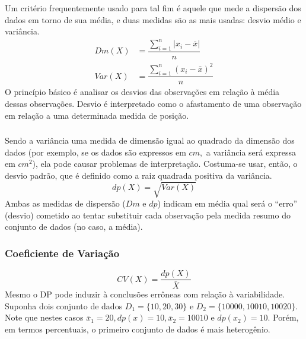 \documentclass[14pt,aspectratio=1610]{beamer}
\begin{document}
\begin{frame}{}
\frametitle{}
\begin{block}{}
\justifying
Um critério frequentemente usado para tal fim é aquele que mede a dispersão dos
dados em torno de sua média, e duas medidas são as mais usadas: desvio médio e variância.
\begin{align}
Dm(X) &=\displaystyle \dfrac{\sum_{i=1}^{n}|x_{i}-\bar{x}|}{n}\\
Var(X)&=\displaystyle \dfrac{\sum_{i=1}^{n}(x_{i}-\bar{x})^{2}}{n}
\end{align}
O princípio básico é analisar os desvios das observações em relação à média dessas observações. Desvio é interpretado como o afastamento de uma observação em relação a uma determinada medida de posição.
\end{block}
\end{frame}

\begin{frame}{}
\frametitle{}
\begin{block}{}
\justifying
Sendo a variância uma medida de dimensão igual ao quadrado da dimensão dos dados (por exemplo, se os dados são expressos em $cm,$ a variância será expressa 
em $cm^{2}$), ela pode causar problemas de interpretação. Costuma-se usar, então, o desvio padrão, que é definido como a raiz quadrada positiva da variância.
\begin{equation}
dp(X)=\sqrt{Var(X)}
\end{equation}
Ambas as medidas de dispersão ($Dm$ e $dp$) indicam em média qual será o ``erro'' (desvio) cometido ao tentar substituir cada observação pela medida resumo do 
conjunto de dados (no caso, a média).
\end{block}
\end{frame}

\begin{frame}{}
\frametitle{Coeficiente de Variação}
\begin{block}{}
\justifying
\begin{equation}
CV(X)=\dfrac{dp(X)}{\bar{X}}
\end{equation}
Mesmo o DP pode induzir à conclusões errôneas com relação à variabilidade. Suponha dois conjunto de dados 
$D_{1}=\{10,20,30\}$ e $D_{2}=\{10000,10010,10020\}.$ Note que nestes casos $\bar{x}_{1}=20, dp(x)=10, 
\bar{x}_{2}=10010$ e $dp(x_{2})=10.$ Porém, em termos percentuais, o primeiro conjunto de dados é mais 
heterogênio.
\end{block}
\end{frame}
\end{document}
